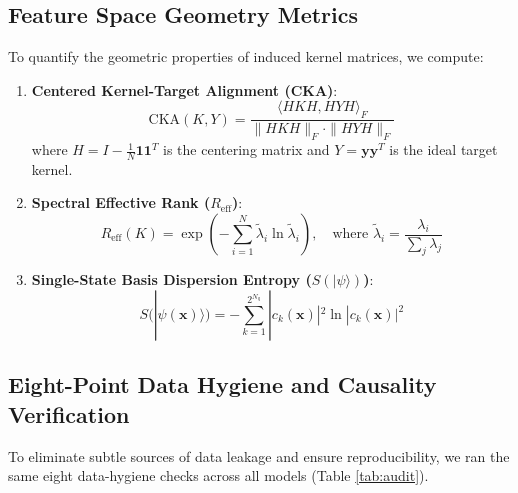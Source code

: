 \documentclass{article}
\begin{document}
\subsection{Feature Space Geometry Metrics}
To quantify the geometric properties of induced kernel matrices, we compute:
\begin{enumerate}
    \setlength{\itemsep}{2pt}
    \item \textbf{Centered Kernel-Target Alignment (CKA)}:
    \begin{equation}
        \text{CKA}(K, Y) = \frac{\langle H K H, H Y H \rangle_F}{\|H K H\|_F \cdot \|H Y H\|_F}
    \end{equation}
    where $H = I - \frac{1}{N} \mathbf{1}\mathbf{1}^T$ is the centering matrix and $Y = \mathbf{y}\mathbf{y}^T$ is the ideal target kernel.
    \item \textbf{Spectral Effective Rank ($R_{\text{eff}}$)}:
    \begin{equation}
        R_{\text{eff}}(K) = \exp\left( -\sum_{i=1}^N \tilde{\lambda}_i \ln \tilde{\lambda}_i \right), \quad \text{where } \tilde{\lambda}_i = \frac{\lambda_i}{\sum_j \lambda_j}
    \end{equation}
    \item \textbf{Single-State Basis Dispersion Entropy ($S(|\psi\rangle)$)}:
    \begin{equation}
        S(|\psi(\mathbf{x})\rangle) = -\sum_{k=1}^{2^{N_q}} |c_k(\mathbf{x})|^2 \ln |c_k(\mathbf{x})|^2
    \end{equation}
\end{enumerate}

\subsection{Eight-Point Data Hygiene and Causality Verification}
To eliminate subtle sources of data leakage and ensure reproducibility, we ran the same eight data-hygiene checks across all models (Table \ref{tab:audit}).
\end{document}
